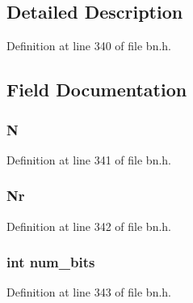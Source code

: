 \subsection{Detailed Description}


Definition at line 340 of file bn.\+h.



\subsection{Field Documentation}
\subsubsection[{\texorpdfstring{N}{N}}]{ N}\hypertarget{structbn__recp__ctx__st_ad0a9b4b193ae5312d7260bedd97090b9}{}\label{structbn__recp__ctx__st_ad0a9b4b193ae5312d7260bedd97090b9}


Definition at line 341 of file bn.\+h.

\subsubsection[{\texorpdfstring{Nr}{Nr}}]{ Nr}\hypertarget{structbn__recp__ctx__st_aa48ed99405e961fd992d716f0cd966cf}{}\label{structbn__recp__ctx__st_aa48ed99405e961fd992d716f0cd966cf}


Definition at line 342 of file bn.\+h.

\subsubsection[{\texorpdfstring{num\+\_\+bits}{num_bits}}]{\setlength{\rightskip}{0pt plus 5cm}int num\+\_\+bits}\hypertarget{structbn__recp__ctx__st_a3248b66d0aee4e118d186124a596f522}{}\label{structbn__recp__ctx__st_a3248b66d0aee4e118d186124a596f522}


Definition at line 343 of file bn.\+h.

